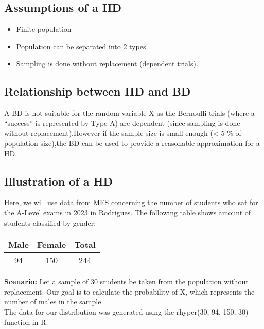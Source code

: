\documentclass{article}
\begin{document}
\subsection{Assumptions of a HD}
\begin{itemize}
  \item Finite population
  \item Population can be separated into 2 types
  \item Sampling is done without replacement (dependent trials).
\end{itemize}

\subsection{Relationship between HD and BD}
A BD is not suitable for the random variable X as the Bernoulli trials
(where a “success” is represented by Type A) are dependent 
(since sampling is done without replacement).However if the sample 
size is small enough (< 5 \% of population size),the BD can be used 
to provide a reasonable approximation for a HD.

\subsection{Illustration of a HD}
Here, we will use data from MES concerning the number of students
who sat for the A-Level exams in 2023 in Rodrigues. The following
table shows amount of students classified by gender:

\begin{center}
  \begin{tabular}{|c|c|c|}
    \hline
    \textbf{Male} & \textbf{Female} & \textbf{Total} \\
    \hline
    \hline
    94 & 150 & 244 \\
    \hline
  \end{tabular}
\end{center}

\textbf{Scenario:}
Let a sample of 30 students be taken from the population without
replacement. Our goal is to calculate the probability of X, which
represents the number of males in the sample \\


The data for our distribution was generated using the 
rhyper(30, 94, 150, 30) function in R:
\end{document}
